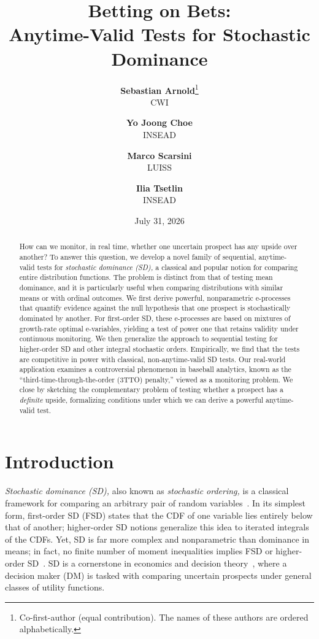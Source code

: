 \documentclass[12pt,twoside]{article}
\title{%
\vspace{-2em}
{\bf Betting on Bets:\\ Anytime-Valid Tests for Stochastic Dominance}
\vspace{0.5em}
}
\author{%
    {\bf Sebastian Arnold}\thanks{Co-first-author (equal contribution). The names of these authors are ordered alphabetically.} \\
    CWI \\
    \email{sebastian.arnold@cwi.nl} 
    \and
    {\bf Yo Joong Choe}\footnotemark[1] \\
    INSEAD \\
    \email{yojoong.choe@insead.edu} 
    \and
    {\bf Marco Scarsini} \\
    LUISS \\
    \email{marco.scarsini@luiss.it} 
    \and
    {\bf Ilia Tsetlin} \\
    INSEAD \\
    \email{ilia.tsetlin@insead.edu}
    \vspace{1em}
}
\date{\normalsize July 31, 2026}
\theoremstyle{plain}
\theoremstyle{definition}
\theoremstyle{remark}
\begin{document}
\onehalfspacing

\maketitle

\vspace{-2em}
\begin{abstract}
How can we monitor, in real time, whether one uncertain prospect has any upside over another? 
To answer this question, we develop a novel family of sequential, anytime-valid tests for \emph{stochastic dominance (SD),} a classical and popular notion for comparing entire distribution functions. 
The problem is distinct from that of testing mean dominance, and it is particularly useful when comparing distributions with similar means or with ordinal outcomes. 
We first derive powerful, nonparametric e-processes that quantify evidence against the null hypothesis that one prospect is stochastically dominated by another. 
For first-order SD, these e-processes are based on mixtures of growth-rate optimal e-variables, yielding a test of power one that retains validity under continuous monitoring. 
We then generalize the approach to sequential testing for higher-order SD and other integral stochastic orders. 
Empirically, we find that the tests are competitive in power with classical, non-anytime-valid SD tests.
Our real-world application examines a controversial phenomenon in baseball analytics, known as the ``third-time-through-the-order (3TTO) penalty,'' viewed as a monitoring problem. 
We close by sketching the complementary problem of testing whether a prospect has a \emph{definite} upside, formalizing conditions under which we can derive a powerful anytime-valid test.  


\end{abstract}

\clearpage


\section{Introduction}\label{sec:introduction}

\emph{Stochastic dominance (SD),} also known as \emph{stochastic ordering,} is a classical framework for comparing an arbitrary pair of random variables~\citep[e.g.,][]{muller2002comparison,shaked2007stochastic}. 
In its simplest form, first-order SD (FSD) states that the CDF of one variable lies entirely below that of another; higher-order SD notions generalize this idea to iterated integrals of the CDFs.
Yet, SD is far more complex and nonparametric than dominance in means; in fact, no finite number of moment inequalities implies FSD or higher-order SD~\citep{brockett1992risk}.
SD is a cornerstone in economics and decision theory~\citep[e.g.,][]{fishburn1970utility,levy1992stochastic,muller2002comparison}, where a decision maker (DM) is tasked with comparing uncertain prospects under general classes of utility functions. 
\end{document}
